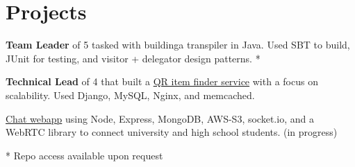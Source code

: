 \documentclass[]{hieudo-build}
\begin{document}
\begin{minipage}[t]{0.65\textwidth}


\section{Projects}
\descript{}
{\bf Team Leader} of 5 tasked with buildinga transpiler in Java. Used SBT to build, JUnit for testing, and visitor + delegator design patterns. *
\sectionsep

\descript{}
{\bf Technical Lead} of 4 that built a \href{https://github.com/JasonYao/Large-Scale-Final-Project-Lost-and-Found-Recovery-Service}{QR item finder service} with a focus on scalability. Used Django, MySQL, Nginx, and memcached.
\sectionsep

\descript{}
\href{https://github.com/JasonYao/university-video-meeter}{Chat webapp} using Node, Express, MongoDB, AWS-S3, socket.io, and a  WebRTC library to connect university and high school students. (in progress)\\
\sectionsep

* Repo access available upon request
\end{minipage}
\end{document}
